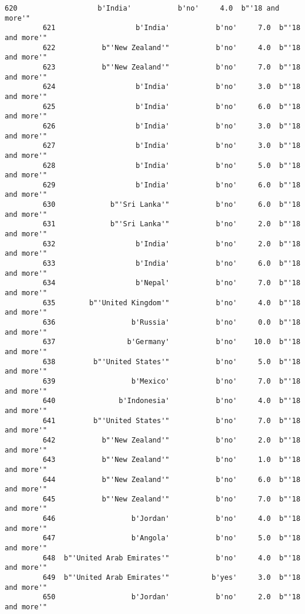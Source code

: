 \documentclass[11pt]{article}
\begin{document}
\begin{Verbatim}[commandchars=\\\{\}]
         620                   b'India'           b'no'     4.0  b"'18 and more'"   
         621                   b'India'           b'no'     7.0  b"'18 and more'"   
         622           b"'New Zealand'"           b'no'     4.0  b"'18 and more'"   
         623           b"'New Zealand'"           b'no'     7.0  b"'18 and more'"   
         624                   b'India'           b'no'     3.0  b"'18 and more'"   
         625                   b'India'           b'no'     6.0  b"'18 and more'"   
         626                   b'India'           b'no'     3.0  b"'18 and more'"   
         627                   b'India'           b'no'     3.0  b"'18 and more'"   
         628                   b'India'           b'no'     5.0  b"'18 and more'"   
         629                   b'India'           b'no'     6.0  b"'18 and more'"   
         630             b"'Sri Lanka'"           b'no'     6.0  b"'18 and more'"   
         631             b"'Sri Lanka'"           b'no'     2.0  b"'18 and more'"   
         632                   b'India'           b'no'     2.0  b"'18 and more'"   
         633                   b'India'           b'no'     6.0  b"'18 and more'"   
         634                   b'Nepal'           b'no'     7.0  b"'18 and more'"   
         635        b"'United Kingdom'"           b'no'     4.0  b"'18 and more'"   
         636                  b'Russia'           b'no'     0.0  b"'18 and more'"   
         637                 b'Germany'           b'no'    10.0  b"'18 and more'"   
         638         b"'United States'"           b'no'     5.0  b"'18 and more'"   
         639                  b'Mexico'           b'no'     7.0  b"'18 and more'"   
         640               b'Indonesia'           b'no'     4.0  b"'18 and more'"   
         641         b"'United States'"           b'no'     7.0  b"'18 and more'"   
         642           b"'New Zealand'"           b'no'     2.0  b"'18 and more'"   
         643           b"'New Zealand'"           b'no'     1.0  b"'18 and more'"   
         644           b"'New Zealand'"           b'no'     6.0  b"'18 and more'"   
         645           b"'New Zealand'"           b'no'     7.0  b"'18 and more'"   
         646                  b'Jordan'           b'no'     4.0  b"'18 and more'"   
         647                  b'Angola'           b'no'     5.0  b"'18 and more'"   
         648  b"'United Arab Emirates'"           b'no'     4.0  b"'18 and more'"   
         649  b"'United Arab Emirates'"          b'yes'     3.0  b"'18 and more'"   
         650                  b'Jordan'           b'no'     2.0  b"'18 and more'"   

\end{Verbatim}
\end{document}
